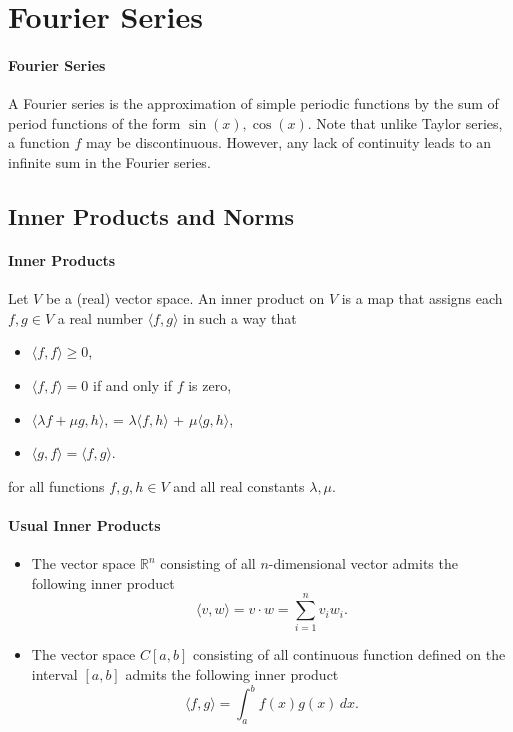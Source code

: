
\section{Fourier Series}

\paragraph{Fourier Series}
A Fourier series is the approximation of simple periodic functions by
the sum of period functions of the form \(\sin(x), \cos(x)\).
Note that unlike Taylor series, a function \(f\) may be discontinuous.
However, any lack of continuity leads to an infinite sum in the Fourier series.

\subsection{Inner Products and Norms}
\paragraph{Inner Products}
Let \(V\) be a (real) vector space. An inner product on \(V\) is a map
that assigns each \(f,g\in V\) a real number \(\langle f, g \rangle\)
in such a way that
\begin{itemize}
    \item \(\langle f, f \rangle \geq 0\),
    \item \(\langle f, f \rangle = 0\) if and only if \(f\) is zero,
    \item \(\langle \lambda f + \mu g, h\rangle\),
    = \(\lambda\langle f, h\rangle\) + \(\mu\langle g, h\rangle\),
    \item \(\langle g, f \rangle = \langle f, g \rangle\).
\end{itemize}
for all functions \(f,g,h \in V\) and all real constants \(\lambda, \mu\).

\paragraph{Usual Inner Products}
\begin{itemize}
    \item The vector space \(\mathbb R^n\) consisting of all \(n\)-dimensional vector admits the following inner product
    \[ \langle v, w \rangle = v\cdot w = \sum_{i=1}^n v_i w_i.\]
    \item The vector space \(C[a, b]\) consisting of all continuous
    function defined on the interval \([a, b]\) admits the following inner product
    \[\langle f, g \rangle = \int_{a}^{b} f(x) g(x) \, dx.\]
\end{itemize}

